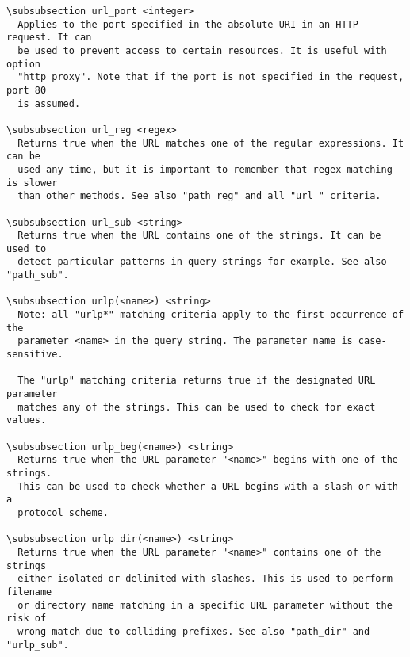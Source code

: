 \begin{verbatim}
\subsubsection url_port <integer>
  Applies to the port specified in the absolute URI in an HTTP request. It can
  be used to prevent access to certain resources. It is useful with option
  "http_proxy". Note that if the port is not specified in the request, port 80
  is assumed.

\subsubsection url_reg <regex>
  Returns true when the URL matches one of the regular expressions. It can be
  used any time, but it is important to remember that regex matching is slower
  than other methods. See also "path_reg" and all "url_" criteria.

\subsubsection url_sub <string>
  Returns true when the URL contains one of the strings. It can be used to
  detect particular patterns in query strings for example. See also "path_sub".

\subsubsection urlp(<name>) <string>
  Note: all "urlp*" matching criteria apply to the first occurrence of the
  parameter <name> in the query string. The parameter name is case-sensitive.

  The "urlp" matching criteria returns true if the designated URL parameter
  matches any of the strings. This can be used to check for exact values.

\subsubsection urlp_beg(<name>) <string>
  Returns true when the URL parameter "<name>" begins with one of the strings.
  This can be used to check whether a URL begins with a slash or with a
  protocol scheme.

\subsubsection urlp_dir(<name>) <string>
  Returns true when the URL parameter "<name>" contains one of the strings
  either isolated or delimited with slashes. This is used to perform filename
  or directory name matching in a specific URL parameter without the risk of
  wrong match due to colliding prefixes. See also "path_dir" and "urlp_sub".


\end{verbatim}
